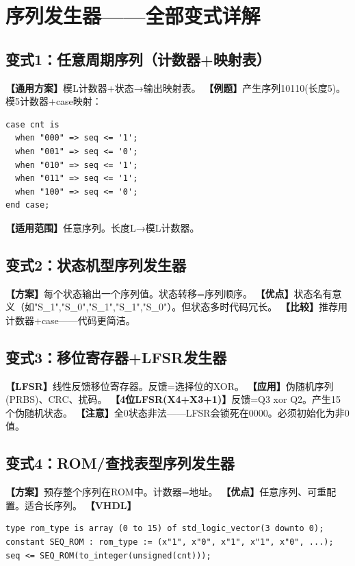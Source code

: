 \chapter{序列发生器——全部变式详解}

\section{变式1：任意周期序列（计数器+映射表）}

\begin{detailbox}[完整教学]
\textbf{【通用方案】}模L计数器+状态→输出映射表。
\textbf{【例题】}产生序列10110(长度5)。模5计数器+case映射：
\begin{lstlisting}
case cnt is
  when "000" => seq <= '1';
  when "001" => seq <= '0';
  when "010" => seq <= '1';
  when "011" => seq <= '1';
  when "100" => seq <= '0';
end case;
\end{lstlisting}
\textbf{【适用范围】}任意序列。长度L→模L计数器。
\end{detailbox}


\section{变式2：状态机型序列发生器}

\begin{detailbox}[完整教学]
\textbf{【方案】}每个状态输出一个序列值。状态转移=序列顺序。
\textbf{【优点】}状态名有意义（如"S\_1","S\_0","S\_1","S\_1","S\_0"）。但状态多时代码冗长。
\textbf{【比较】}推荐用计数器+case——代码更简洁。
\end{detailbox}


\section{变式3：移位寄存器+LFSR发生器}

\begin{detailbox}[完整教学]
\textbf{【LFSR】}线性反馈移位寄存器。反馈=选择位的XOR。
\textbf{【应用】}伪随机序列(PRBS)、CRC、扰码。
\textbf{【4位LFSR(X4+X3+1)】}反馈=Q3 xor Q2。产生15个伪随机状态。
\textbf{【注意】}全0状态非法——LFSR会锁死在0000。必须初始化为非0值。
\end{detailbox}


\section{变式4：ROM/查找表型序列发生器}

\begin{detailbox}[完整教学]
\textbf{【方案】}预存整个序列在ROM中。计数器=地址。
\textbf{【优点】}任意序列、可重配置。适合长序列。
\textbf{【VHDL】}
\begin{lstlisting}
type rom_type is array (0 to 15) of std_logic_vector(3 downto 0);
constant SEQ_ROM : rom_type := (x"1", x"0", x"1", x"1", x"0", ...);
seq <= SEQ_ROM(to_integer(unsigned(cnt)));
\end{lstlisting}
\end{detailbox}
